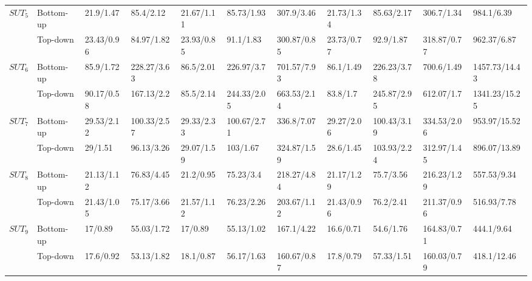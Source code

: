 \documentclass[conference]{IEEEtran}
\theoremstyle{definition}
\begin{document}
\begin{table}[h]
\begin{tabular}{|l|l|ll|lll|llll|}
\multirow{2}{*}{$SUT_{5}$} & Bottom-up & 21.9/1.47        & 85.4/2.12        & 21.67/1.11 & 85.73/1.93  & 307.9/3.46  & 21.73/1.34 & 85.63/2.17  & 306.7/1.34  & 984.1/6.39    \\
                      & Top-down  & 23.43/0.96       & 84.97/1.82       & 23.93/0.85 & 91.1/1.83   & 300.87/0.85 & 23.73/0.77 & 92.9/1.87   & 318.87/0.77 & 962.37/6.87   \\ \hline
\multirow{2}{*}{$SUT_{6}$} & Bottom-up & 85.9/1.72        & 228.27/3.63      & 86.5/2.01  & 226.97/3.7  & 701.57/7.93 & 86.1/1.49  & 226.23/3.78 & 700.6/1.49  & 1457.73/14.43 \\
                      & Top-down  & 90.17/0.58       & 167.13/2.2       & 85.5/2.14  & 244.33/2.05 & 663.53/2.14 & 83.8/1.7   & 245.87/2.95 & 612.07/1.7  & 1341.23/15.25 \\ \hline
\multirow{2}{*}{$SUT_{7}$} & Bottom-up & 29.53/2.12       & 100.33/2.57      & 29.33/2.33 & 100.67/2.71 & 336.8/7.07  & 29.27/2.06 & 100.43/3.19 & 334.53/2.06 & 953.97/15.52  \\
                      & Top-down  & 29/1.51          & 96.13/3.26       & 29.07/1.59 & 103/1.67    & 324.87/1.59 & 28.6/1.45  & 103.93/2.24 & 312.97/1.45 & 896.07/13.89  \\ \hline
\multirow{2}{*}{$SUT_{8}$} & Bottom-up & 21.13/1.12       & 76.83/4.45       & 21.2/0.95  & 75.23/3.4   & 218.27/4.84 & 21.17/1.29 & 75.7/3.56   & 216.23/1.29 & 557.53/9.34   \\
                      & Top-down  & 21.43/1.05       & 75.17/3.66       & 21.57/1.12 & 76.23/2.26  & 203.67/1.12 & 21.43/0.96 & 76.2/2.41   & 211.37/0.96 & 516.93/7.78   \\ \hline
\multirow{2}{*}{$SUT_{9}$} & Bottom-up & 17/0.89          & 55.03/1.72       & 17/0.89    & 55.13/1.02  & 167.1/4.22  & 16.6/0.71  & 54.6/1.76   & 164.83/0.71 & 444.1/9.64    \\
                      & Top-down  & 17.6/0.92        & 53.13/1.82       & 18.1/0.87  & 56.17/1.63  & 160.67/0.87 & 17.8/0.79  & 57.33/1.51  & 160.03/0.79 & 418.1/12.46   \\ \hline
\end{tabular}
\end{table}
\end{document}
